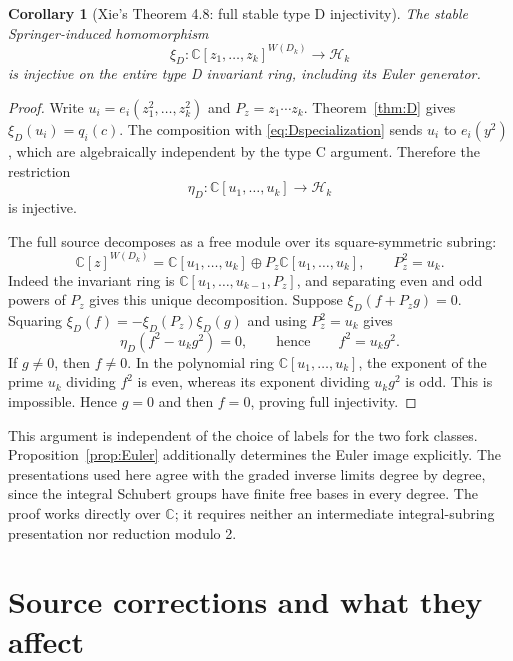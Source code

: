 \documentclass[11pt,letterpaper]{article}
\newtheorem{corollary}[theorem]{Corollary}
\theoremstyle{remark}
\newcommand{\C}{\mathbb C}
\begin{document}
\begin{corollary}[Xie's Theorem 4.8: full stable type D injectivity]\label{cor:Dstable}
The stable Springer-induced homomorphism
\[
 \xi_D:\C[z_1,\ldots,z_k]^{W(D_k)}\longrightarrow\mathcal H_k
\]
is injective on the entire type D invariant ring, including its Euler generator.
\end{corollary}
\begin{proof}
Write $u_i=e_i(z_1^2,\ldots,z_k^2)$ and $P_z=z_1\cdots z_k$. Theorem~\ref{thm:D} gives $\xi_D(u_i)=q_i(c)$. The composition with \eqref{eq:Dspecialization} sends $u_i$ to $e_i(y^2)$, which are algebraically independent by the type C argument. Therefore the restriction
\[
 \eta_D:\C[u_1,\ldots,u_k]\longrightarrow\mathcal H_k
\]
is injective.

The full source decomposes as a free module over its square-symmetric subring:
\[
 \C[z]^{W(D_k)}=\C[u_1,\ldots,u_k]\oplus
        P_z\C[u_1,\ldots,u_k],\qquad P_z^2=u_k.
\]
Indeed the invariant ring is $\C[u_1,\ldots,u_{k-1},P_z]$, and separating even and odd powers of $P_z$ gives this unique decomposition. Suppose $\xi_D(f+P_zg)=0$. Squaring $\xi_D(f)=-\xi_D(P_z)\xi_D(g)$ and using $P_z^2=u_k$ gives
\[
 \eta_D(f^2-u_k g^2)=0,\qquad\text{hence}\qquad f^2=u_k g^2.
\]
If $g\ne0$, then $f\ne0$. In the polynomial ring $\C[u_1,\ldots,u_k]$, the exponent of the prime $u_k$ dividing $f^2$ is even, whereas its exponent dividing $u_k g^2$ is odd. This is impossible. Hence $g=0$ and then $f=0$, proving full injectivity.
\end{proof}

This argument is independent of the choice of labels for the two fork classes. Proposition~\ref{prop:Euler} additionally determines the Euler image explicitly. The presentations used here agree with the graded inverse limits degree by degree, since the integral Schubert groups have finite free bases in every degree. The proof works directly over $\C$; it requires neither an intermediate integral-subring presentation nor reduction modulo 2.

\section{Source corrections and what they affect}
\label{sec:corrections}
\end{document}
